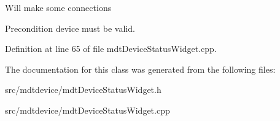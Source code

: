 Will make some connections

\begin{DoxyPrecond}{Precondition}
device must be valid. 
\end{DoxyPrecond}


Definition at line 65 of file mdtDeviceStatusWidget.cpp.



The documentation for this class was generated from the following files:\begin{DoxyCompactItemize}
\item 
src/mdtdevice/mdtDeviceStatusWidget.h\item 
src/mdtdevice/mdtDeviceStatusWidget.cpp\end{DoxyCompactItemize}
